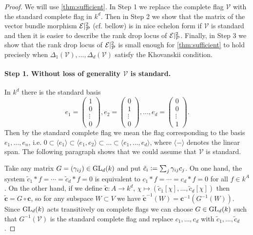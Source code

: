 \begin{proof}
    We will use \autoref{thm:sufficient}. In Step 1 we replace the complete flag $\mathcal V$ with the standard complete flag in $k^d$. Then in Step 2 we show that the matrix of  the vector bundle morphism $\mathcal E|^2_\P$ (cf. bellow) is in nice echelon form if $\mathcal V$ is standard and then it is easier to describe the rank drop locus of $\mathcal E|^2_\P$. Finally, in Step 3 we show that the rank drop locus of $\mathcal E|^2_\P$ is small enough for \autoref{thm:sufficient} to hold precisely when $\Delta_1(\mathcal V), \dots, \Delta_d(\mathcal V)$ satisfy the Khovanskii condition.
    

    \paragraph{Step 1. Without loss of generality $\mathcal V$ is standard.} In $k^d$ there is the standard basis
    \[
    e_1 = 
    \begin{pmatrix}
        1 \\ 0 \\ \vdots \\ 0
    \end{pmatrix},
    e_2 = 
    \begin{pmatrix}
        0 \\ 1 \\ \vdots \\ 0
    \end{pmatrix},
    \dots, 
    e_d = 
    \begin{pmatrix}
        0 \\ 0 \\ \vdots \\ 1
    \end{pmatrix}.
    \]
    Then by the standard complete flag we mean the flag corresponding to the basis $e_1, \dots, e_n$, i.e. $0 \subset \langle e_1 \rangle \subset \langle e_1, e_2 \rangle \subset \dots \subset \langle e_1, \dots, e_d \rangle$, where $\langle - \rangle$ denotes the linear span. The following paragraph shows that we could assume that $\mathcal V$ is standard. 
    
    Take any matrix $G = (\gamma_{ij}) \in \GL_d (k)$ and put $\tilde c_i \defeq \sum_j \gamma_{ij} c_j$. On one hand, the system $\tilde c_1 * f = \cdots = \tilde c_d * f = 0$ is equivalent to $c_1 * f = \cdots = c_d * f = 0$ for all $f \in k^A$. On the other hand, if we define $\tilde{\mathbf c}: A \to k^d$, $\chi \mapsto (\tilde c_1 [\chi], \dots, \tilde c_d[\chi])$ then $\tilde {\mathbf c} = G \circ \mathbf c$, so for any subspace $W \subset V$ we have $\tilde {\mathbf c}^{-1} (W) = \mathbf c^{-1} (G^{-1} (W))$. Since $\GL_d (k)$ acts transitively on complete flags we can choose $G \in \GL_d (k)$ such that $G^{-1}(\mathcal V)$ is the standard complete flag and replace $c_1, \dots, c_d$ with $\tilde c_1, \dots, \tilde c_d$.


\end{proof}
